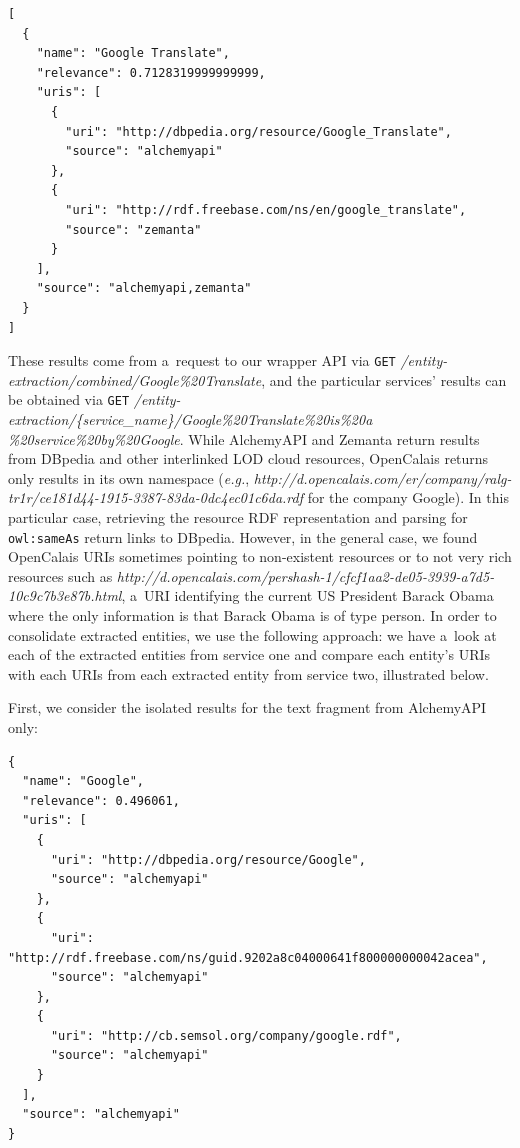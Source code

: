 \begin{lstlisting}
[
  {
    "name": "Google Translate",
    "relevance": 0.7128319999999999,
    "uris": [
      {
        "uri": "http://dbpedia.org/resource/Google_Translate",
        "source": "alchemyapi"
      },
      {
        "uri": "http://rdf.freebase.com/ns/en/google_translate",
        "source": "zemanta"
      }
    ],
    "source": "alchemyapi,zemanta"
  }
]
\end{lstlisting}

These results come from a~request to our wrapper API via \texttt{GET} \textit{/entity-extraction/combined/Google\%20Translate},
and the particular services' results can be obtained via \texttt{GET} \textit{/entity-extraction/\{service\_name\}/Google\%20Translate\%20is\%20a\\\%20service\%20by\%20Google}.
While AlchemyAPI and Zemanta return results from DBpedia and other interlinked LOD cloud resources, OpenCalais returns
only results in its own namespace
(\emph{e.g.}, \textit{http://d.opencalais.com/er/company/ralg-tr1r/ce181d44-1915-3387-83da-0dc4ec01c6da.rdf} for the
company Google). In this particular case, retrieving the resource RDF representation and parsing for
\texttt{owl:sameAs} return links to DBpedia. However, in the general case, we found OpenCalais URIs sometimes pointing
to non-existent resources or to not very rich resources such
as \textit{http://d.opencalais.com/pershash-1/cfcf1aa2-de05-3939-a7d5-10c9c7b3e87b.html}, a~URI identifying
the current US President Barack Obama where the only information is that Barack Obama is of type person. In order to
consolidate extracted entities, we use the following approach: we have a~look at each of the extracted entities from
service one and compare each entity's URIs with each URIs from each extracted entity from service two, illustrated below.

First, we consider the isolated results for the text fragment from AlchemyAPI only:

\begin{lstlisting}
{
  "name": "Google",
  "relevance": 0.496061,
  "uris": [
    {
      "uri": "http://dbpedia.org/resource/Google",
      "source": "alchemyapi"
    },
    {
      "uri": "http://rdf.freebase.com/ns/guid.9202a8c04000641f800000000042acea",
      "source": "alchemyapi"
    },
    {
      "uri": "http://cb.semsol.org/company/google.rdf",
      "source": "alchemyapi"
    }
  ],
  "source": "alchemyapi"
}
\end{lstlisting}

